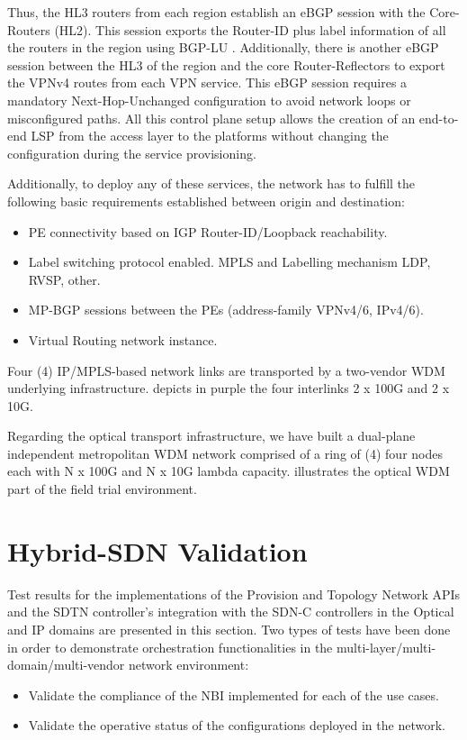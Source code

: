 \documentclass[a4paper,fleqn]{cas-dc}
\begin{document}
Thus, the HL3 routers from each region establish an eBGP session with the Core-Routers (HL2). This session exports the Router-ID plus label information of all the routers in the region using BGP-LU \cite{rfc8277}. Additionally, there is another eBGP session between the HL3 of the region and the core Router-Reflectors to export the VPNv4 routes from each VPN service. This eBGP session requires a mandatory Next-Hop-Unchanged configuration to avoid network loops or misconfigured paths. All this control plane setup allows the creation of an end-to-end LSP from the access layer to the platforms without changing the configuration during the service provisioning.

Additionally, to deploy any of these services, the network has to fulfill the following basic requirements established between origin and destination:
\begin{itemize}
    \item PE connectivity based on IGP Router-ID/Loopback reachability.
    \item Label switching protocol enabled. MPLS and Labelling mechanism LDP, RVSP, other. 
    \item MP-BGP sessions between the PEs (address-family VPNv4/6, IPv4/6).
    \item Virtual Routing network instance. 
\end{itemize}

Four (4) IP/MPLS-based network links are transported by a two-vendor WDM underlying infrastructure.  depicts in purple the four interlinks 2 x 100G and 2 x 10G.  

Regarding the optical transport infrastructure, we have built a dual-plane independent metropolitan WDM network comprised of a ring of (4) four nodes each with N x 100G and N x 10G lambda capacity.  illustrates the optical WDM part of the field trial environment.


\section{Hybrid-SDN Validation}
\label{section:results}

Test results for the implementations of the Provision and Topology Network APIs and the SDTN controller’s integration with the SDN-C controllers in the Optical and IP domains are presented in this section. Two types of tests have been done in order to demonstrate orchestration functionalities in the multi-layer/multi-domain/multi-vendor network environment: 
\begin{itemize}
    \item Validate the compliance of the NBI implemented for each of the use cases.
    \item Validate the operative status of the configurations deployed in the network. 
\end{itemize}
\end{document}
